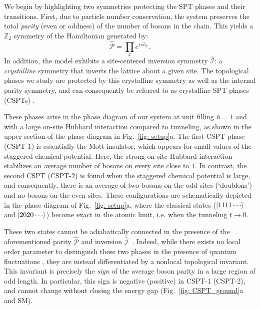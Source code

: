 \documentclass[preprint,superscriptaddress,floatfix, nofootinbib]{revtex4-2}
\begin{document}
We begin by highlighting two symmetries protecting the SPT phases and their transitions.
%
First, due to particle number conservation, the system preserves the total \textit{parity} (even or oddness) of the number of bosons in the chain.
%
This yields a $\mathbb{Z}_2$ symmetry of the Hamiltonian generated by: 
\begin{equation} \label{eq: parity-generator}
 \hat{\mathcal{P}} = \prod_{x} e^{i \pi \hat{n}_x}   .
\end{equation} 
%
In addition, the model exhibits a site-centered inversion symmetry $\hat{\mathcal I}$: a \textit{crystalline} symmetry that inverts the lattice about a given site.
%
The topological phases we study are protected by this crystalline symmetry as well as the internal parity symmetry, and can consequently be referred to as crystalline SPT phases (CSPTs) \cite{Fu11, Turner10inversion, Hughes11, Fuji2015, Song17}.

These phases arise in the phase diagram of our system at unit filling $\bar{n} =1$ and with a large on-site Hubbard interaction compared to tunneling, as shown in the upper section of the phase diagram in Fig.~\ref{fig: setup}a.
%
The first CSPT phase (CSPT-$1$) is essentially the Mott insulator, which appears for small values of the staggered chemical potential.
%
Here, the strong on-site Hubbard interaction stabilizes an average number of bosons on every site close to $1$.
%
In contrast, the second CSPT (CSPT-$2$) is found when the staggered chemical potential is large, and consequently, there is an average of two bosons on the odd sites (`doublons') and no bosons on the even sites.
%
These configurations are schematically depicted in the phase diagram of Fig.~\ref{fig: setup}a, where the classical states ($\ket{1111\cdots}$ and $\ket{2020\cdots}$) become exact in the atomic limit, i.e. when the tunneling $t\to 0$.

These two states cannot be adiabatically connected in the presence of the aforementioned parity $\hat{\mathcal P}$ and inversion $\hat{\mathcal I}$~\cite{Fuji2015}. 
%
Indeed, while there exists no local order parameter to distinguish these two phases in the presence of quantum fluctuations \cite{Fuji2015}, they are instead differentiated by a nonlocal topological invariant.
%
This invariant is precisely the \textit{sign} of the average boson parity in a large region of odd length.
%
In particular, this sign is negative (positive) in CSPT-1 (CSPT-2), and cannot change without closing the energy gap (Fig.~\ref{fig: CSPT_ground}a and SM).
\end{document}
